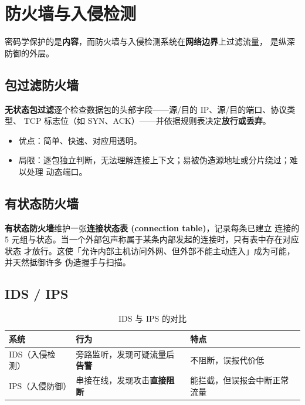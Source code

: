 \section{防火墙与入侵检测}

密码学保护的是\textbf{内容}，而防火墙与入侵检测系统在\textbf{网络边界}上过滤流量，
是纵深防御的外层。

\subsection{包过滤防火墙}

\textbf{无状态包过滤}逐个检查数据包的头部字段——源/目的 IP、源/目的端口、协议类型、
TCP 标志位（如 SYN、ACK）——并依据规则表决定\textbf{放行或丢弃}。

\begin{itemize}
    \item 优点：简单、快速、对应用透明。
    \item 局限：逐包独立判断，无法理解连接上下文；易被伪造源地址或分片绕过；难以处理
    动态端口。
\end{itemize}

\subsection{有状态防火墙}

\textbf{有状态防火墙}维护一张\textbf{连接状态表 (connection table)}，记录每条已建立
连接的 5 元组与状态。当一个外部包声称属于某条内部发起的连接时，只有表中存在对应状态
才放行。这使「允许内部主机访问外网、但外部不能主动连入」成为可能，并天然抵御许多
伪造握手与扫描。

\subsection{IDS / IPS}

\begin{table}[H]
\centering
\renewcommand{\arraystretch}{1.4}
\begin{tabulary}{\textwidth}{@{}L L L@{}}
\toprule
\textbf{系统} & \textbf{行为} & \textbf{特点} \\
\midrule
IDS（入侵检测） & 旁路监听，发现可疑流量后\textbf{告警} & 不阻断，误报代价低 \\
IPS（入侵防御） & 串接在线，发现攻击\textbf{直接阻断} & 能拦截，但误报会中断正常流量 \\
\bottomrule
\end{tabulary}
\caption{IDS 与 IPS 的对比}
\label{tab:ids}
\end{table}

